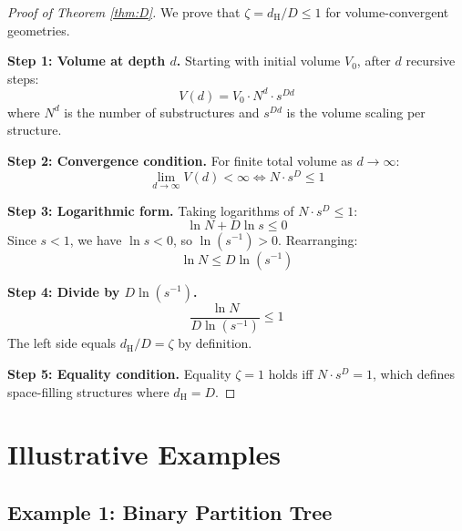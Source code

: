 \documentclass[11pt,a4paper]{article}
\theoremstyle{definition}
\theoremstyle{remark}
\newcommand{\dH}{d_{\mathrm{H}}}
\begin{document}
\begin{proof}[Proof of Theorem \ref{thm:D}]
We prove that $\zeta = \dH/D \leq 1$ for volume-convergent geometries.

\textbf{Step 1: Volume at depth $d$.}
Starting with initial volume $V_0$, after $d$ recursive steps:
\begin{equation}
    V(d) = V_0 \cdot N^d \cdot s^{Dd}
\end{equation}
where $N^d$ is the number of substructures and $s^{Dd}$ is the volume scaling per structure.

\textbf{Step 2: Convergence condition.}
For finite total volume as $d \to \infty$:
\begin{equation}
    \lim_{d \to \infty} V(d) < \infty \iff N \cdot s^D \leq 1
\end{equation}

\textbf{Step 3: Logarithmic form.}
Taking logarithms of $N \cdot s^D \leq 1$:
\begin{equation}
    \ln N + D \ln s \leq 0
\end{equation}
Since $s < 1$, we have $\ln s < 0$, so $\ln(s^{-1}) > 0$. Rearranging:
\begin{equation}
    \ln N \leq D \ln(s^{-1})
\end{equation}

\textbf{Step 4: Divide by $D \ln(s^{-1})$.}
\begin{equation}
    \frac{\ln N}{D \ln(s^{-1})} \leq 1
\end{equation}
The left side equals $\dH/D = \zeta$ by definition.

\textbf{Step 5: Equality condition.}
Equality $\zeta = 1$ holds iff $N \cdot s^D = 1$, which defines space-filling structures where $\dH = D$.
\end{proof}

\section{Illustrative Examples}
\label{sec:examples}

\subsection{Example 1: Binary Partition Tree}
\end{document}
